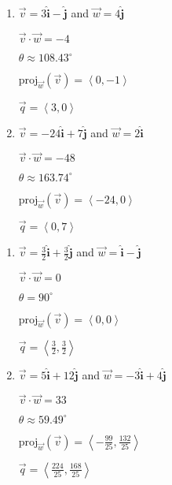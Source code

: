 \begin{multicols}{2} \raggedcolumns 
\begin{enumerate}
\setcounter{enumi}{\value{HW}}


\item $\vec{v} =3 \bm\hat{\text{i}}-  \bm\hat{\text{j}}$ and $\vec{w} = 4 \bm\hat{\text{j}}$

 $\vec{v} \cdot \vec{w} = -4$

 $\theta \approx 108.43^{\circ}$ 

 $\text{proj}_{\vec{w}}(\vec{v}) = \left\langle 0,-1 \right\rangle$

 $\vec{q} = \left\langle 3,0 \right\rangle$

\vfill

\item $\vec{v} = -24 \bm\hat{\text{i}}+ 7 \bm\hat{\text{j}}$ and $\vec{w} = 2 \bm\hat{\text{i}}$

 $\vec{v} \cdot \vec{w} = -48$

 $\theta \approx 163.74^{\circ}$ 

 $\text{proj}_{\vec{w}}(\vec{v}) = \left\langle -24,0 \right\rangle$

 $\vec{q} = \left\langle 0,7\right\rangle$
 
\setcounter{HW}{\value{enumi}}
\end{enumerate}
\end{multicols}



\begin{multicols}{2} \raggedcolumns 
\begin{enumerate}
\setcounter{enumi}{\value{HW}}


\item  $\vec{v} =\frac{3}{2}  \bm\hat{\text{i}}+ \frac{3}{2}  \bm\hat{\text{j}}$ and $\vec{w} =  \bm\hat{\text{i}}-  \bm\hat{\text{j}}$

 $\vec{v} \cdot \vec{w} = 0$

 $\theta = 90^{\circ}$ 

 $\text{proj}_{\vec{w}}(\vec{v}) = \left\langle 0,0 \right\rangle$

 $\vec{q} = \left\langle \frac{3}{2},\frac{3}{2} \right\rangle$

\vfill

\item $\vec{v} = 5 \bm\hat{\text{i}}+ 12 \bm\hat{\text{j}}$ and $\vec{w} = -3 \bm\hat{\text{i}}+ 4 \bm\hat{\text{j}}$

 $\vec{v} \cdot \vec{w} = 33$

 $\theta \approx  59.49^{\circ}$ 

 $\text{proj}_{\vec{w}}(\vec{v}) = \left\langle -\frac{99}{25}, \frac{132}{25} \right\rangle$

 $\vec{q} = \left\langle \frac{224}{25},\frac{168}{25} \right\rangle$
 
\setcounter{HW}{\value{enumi}}
\end{enumerate}
\end{multicols}


